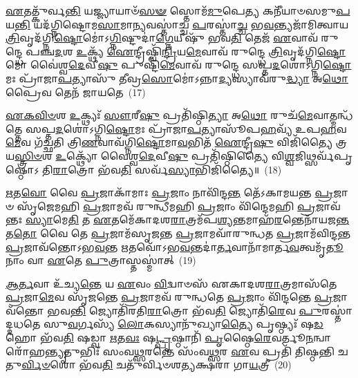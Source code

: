 \-\ul{𑌏}\-𑌤𑌤𑍍𑌕𑍁᳴𑌰𑍍𑌵\-\ul{𑌨𑍍𑌤𑌿} 𑌯𑌜𑍍𑌜𑍍𑌯𑌾𑌯𑌾𑍞᳴\-\ul{𑌸}\-\-\ul{𑍟} 𑌸𑍍𑌤𑍋𑌮᳴\-\ul{𑌮𑍁}\-𑌪𑍇\-\ul{𑌤𑍍𑌯} 𑌕𑌨𑍀᳴𑌯𑌾𑍞𑌸𑌮𑍁\-\ul{𑌪}\-𑌯\-\ul{𑌨𑍍𑌤𑌿} 𑌯𑌦᳴𑌗𑍍𑌨𑌿𑌷𑍍𑌟𑍋𑌮\-\ul{𑌸𑌾}\-𑌮𑌾\-\ul{𑌨𑍍𑌯}\-𑌵𑌸𑍍𑌤𑌾॑𑌚𑍍𑌚 \ul{𑌪}\-𑌰𑌸𑍍𑌤𑌾॑\-\ul{𑌚𑍍𑌚} 𑌭\-\ul{𑌵}\-𑌨𑍍𑌤𑍍𑌯𑌜𑌾᳴𑌮𑌿𑌤𑍍𑌵𑌾𑌯 \ul{𑌤𑍍𑌰𑌿}\-𑌵𑍃𑌦᳴𑌗𑍍𑌨𑌿\-\ul{𑌷𑍍𑌟𑍋}\-𑌮𑍋॑\-𑌽\-\ul{𑌗𑍍𑌨𑌿}\-𑌷𑍍𑌟𑍁𑌦𑌾॑\-\ul{𑌗𑍍𑌨𑍇}\-𑌯𑍀𑌷𑍁᳴ 𑌭𑌵\-\ul{𑌤𑌿} 𑌤𑍇𑌜᳴ \ul{𑌏}\-𑌵𑌾𑌵᳴ 𑌰𑍁𑌨𑍍𑌦𑍍𑌧𑍇 𑌪𑌞𑍍𑌚\-\ul{𑌦}\-𑌶 \ul{𑌉}\-𑌕𑍍𑌥𑍍𑌯᳴ \ul{𑌐}\-𑌨𑍍𑌦𑍍𑌰𑍀𑌷𑍍𑌵𑌿᳴\-\ul{𑌨𑍍𑌦𑍍𑌰𑌿}\-𑌯\-\ul{𑌮𑍇}\-𑌵𑌾𑌵᳴ 𑌰𑍁𑌨𑍍𑌦𑍍𑌧𑍇 \ul{𑌤𑍍𑌰𑌿}\-𑌵𑍃𑌦᳴𑌗𑍍𑌨𑌿\-\ul{𑌷𑍍𑌟𑍋}\-𑌮𑍋 𑌵𑍈॑𑌶𑍍𑌵\-\ul{𑌦𑍇}\-𑌵𑍀\-\ul{𑌷𑍁} 𑌪𑍁𑌷𑍍𑌟𑌿᳴\-\ul{𑌮𑍇}\-𑌵𑌾𑌵᳴ 𑌰𑍁𑌨𑍍𑌦𑍍𑌧𑍇 𑌸𑌪𑍍𑌤\-\ul{𑌦}\-𑌶𑍋॑\-𑌽𑌗𑍍𑌨𑌿\-\ul{𑌷𑍍𑌟𑍋}\-𑌮𑌃 𑌪𑍍𑌰𑌾᳴𑌜𑌾\-\ul{𑌪}\-𑌤𑍍𑌯𑌾𑌸𑍁᳴ 𑌤𑍀𑌵𑍍𑌰\-\ul{𑌸𑍋}\-𑌮𑍋॑\-𑌽𑌨𑍍𑌨𑌾\-\ul{𑌦𑍍𑌯}\-𑌸𑍍𑌯𑌾𑌵᳴𑌰𑍁\-\ul{𑌦𑍍𑌧𑍍𑌯𑌾} 𑌅\-\ul{𑌥𑍋} 𑌪𑍍𑌰𑍈𑌵 𑌤𑍇𑌨᳴ 𑌜𑌾𑌯𑌤𑍇~(17)

\-\ul{𑌏}\-\-\ul{𑌕}\-\-\ul{𑌵𑌿}\-\-\ul{𑍞}\-𑌶 \ul{𑌉}\-𑌕𑍍𑌥𑍍𑌯𑌃᳴ \ul{𑌸𑍗}\-𑌰𑍀\-\ul{𑌷𑍁} 𑌪𑍍𑌰𑌤𑌿᳴𑌷𑍍𑌠𑌿\-\ul{𑌤𑍍𑌯𑌾} 𑌅\-\ul{𑌥𑍋} 𑌰𑍁𑌚᳴\-\ul{𑌮𑍇}\-𑌵𑌾𑌤𑍍𑌮𑌨𑍍𑌧᳴𑌤𑍍𑌤𑍇 𑌸𑌪𑍍𑌤\-\ul{𑌦}\-𑌶𑍋॑\-𑌽𑌗𑍍𑌨𑌿\-\ul{𑌷𑍍𑌟𑍋}\-𑌮𑌃 𑌪𑍍𑌰𑌾᳴𑌜𑌾\-\ul{𑌪}\-𑌤𑍍𑌯𑌾𑌸𑍂᳴𑌪\-\ul{𑌹}\-𑌵𑍍𑌯᳴ 𑌉𑌪\-\ul{𑌹}\-𑌵\-\ul{𑌮𑍇}\-𑌵 𑌗᳴𑌚𑍍𑌛𑌤𑌿 𑌤𑍍𑌰𑌿\-\ul{𑌣}\-𑌵𑌾𑌵᳴𑌗𑍍𑌨𑌿\-\ul{𑌷𑍍𑌟𑍋}\-𑌮𑌾\-\ul{𑌵}\-𑌭𑌿𑌤᳴ \ul{𑌐}\-𑌨𑍍𑌦𑍍𑌰𑍀\-\ul{𑌷𑍁} 𑌵𑌿𑌜𑌿᳴𑌤𑍍𑌯𑍈 𑌤𑍍𑌰𑌯\-\ul{𑌸𑍍𑌤𑍍𑌰𑌿}\-\-\ul{𑍞}\-𑌶 \ul{𑌉}\-𑌕𑍍𑌥𑍍𑌯𑍋᳴ 𑌵𑍈𑌶𑍍𑌵\-\ul{𑌦𑍇}\-𑌵𑍀\-\ul{𑌷𑍁} 𑌪𑍍𑌰𑌤𑌿᳴𑌷𑍍𑌠𑌿𑌤𑍍𑌯𑍈 𑌵𑌿\-\ul{𑌶𑍍𑌵}\-𑌜𑌿𑌥𑍍𑌸𑌰𑍍𑌵᳴𑌪𑍃𑌷𑍍𑌠𑍋\-𑌽 𑌤𑌿\-\ul{𑌰𑌾}\-𑌤𑍍𑌰𑍋 𑌭᳴𑌵\-\ul{𑌤𑌿} 𑌸𑌰𑍍𑌵᳴\-\ul{𑌸𑍍𑌯𑌾}\-𑌭𑌿𑌜𑌿᳴𑌤𑍍𑌯𑍈॥~(18)

{\anuvakamend[{\-\ul{𑌪𑍍𑌰𑌾}\-\-\ul{𑌜𑌾}\-\-\ul{𑌪}\-𑌤𑍍𑌯𑍋 𑌵𑌾 \ul{𑌏}\-𑌷 \ul{𑌯}\-𑌜𑍍𑌞𑍋 𑌯𑌦𑍍𑌦᳴𑌶\-\ul{𑌰𑌾}\-𑌤𑍍𑌰𑌸𑍍𑌤𑍍𑌰𑌿᳴\-\ul{𑌕}\-𑌕𑍁𑌦𑍍𑌵𑌾 \ul{𑌏}\-𑌤𑌾 𑌵𑍈 𑌜𑌾᳴𑌯\-\ul{𑌤} 𑌏𑌕᳴𑌤𑍍𑌰𑌿𑍞𑌶𑌚𑍍𑌚}]}%

\-\ul{𑌋}\-𑌤\-\ul{𑌵𑍋} 𑌵𑍈 \ul{𑌪𑍍𑌰}\-𑌜𑌾𑌕𑌾᳴𑌮𑌾𑌃 \ul{𑌪𑍍𑌰}\-𑌜𑌾𑌂 𑌨𑌾𑌵𑌿᳴𑌨𑍍𑌦\-\ul{𑌨𑍍𑌤} 𑌤𑍇᳴\-𑌽𑌕𑌾𑌮𑌯𑌨𑍍𑌤 \ul{𑌪𑍍𑌰}\-𑌜𑌾𑍞 𑌸𑍃᳴𑌜𑍇𑌮𑌹𑌿 \ul{𑌪𑍍𑌰}\-𑌜𑌾𑌮𑌵᳴ 𑌰𑍁𑌨𑍍𑌧𑍀𑌮𑌹𑌿 \ul{𑌪𑍍𑌰}\-𑌜𑌾𑌂 𑌵𑌿᳴𑌨𑍍𑌦𑍇𑌮𑌹𑌿 \ul{𑌪𑍍𑌰}\-𑌜𑌾𑌵᳴𑌨𑍍𑌤𑌃 \ul{𑌸𑍍𑌯𑌾}\-𑌮𑍇\-\ul{𑌤𑌿} 𑌤 \ul{𑌏}\-𑌤𑌮𑍇᳴𑌕𑌾𑌦𑌶\-\ul{𑌰𑌾}\-𑌤𑍍𑌰𑌮᳴𑌪\-\ul{𑌶𑍍𑌯}\-𑌨𑍍𑌤𑌮𑌾𑌹᳴\-\ul{𑌰}\-𑌨𑍍𑌤𑍇𑌨𑌾᳴𑌯𑌜\-\ul{𑌨𑍍𑌤} 𑌤\-\ul{𑌤𑍋} 𑌵𑍈 𑌤𑍇 \ul{𑌪𑍍𑌰}\-𑌜𑌾𑌮᳴𑌸𑍃𑌜𑌨𑍍𑌤 \ul{𑌪𑍍𑌰}\-𑌜𑌾𑌮𑌵𑌾᳴𑌰𑍁𑌨𑍍𑌧𑌤 \ul{𑌪𑍍𑌰}\-𑌜𑌾𑌮᳴𑌵𑌿𑌨𑍍𑌦𑌨𑍍𑌤 \ul{𑌪𑍍𑌰}\-𑌜𑌾𑌵᳴𑌨𑍍𑌤𑍋\-𑌽𑌭\-\ul{𑌵}\-𑌨𑍍𑌤 \ul{𑌋}\-𑌤𑌵𑍋᳴\-𑌽𑌭\-\ul{𑌵}\-𑌨𑍍𑌤𑌦𑌾॑\-\ul{𑌰𑍍𑌤}\-𑌵𑌾𑌨𑌾᳴𑌮𑌾𑌰𑍍𑌤\-\ul{𑌵}\-𑌤𑍍𑌵𑌮𑍃᳴\-\ul{𑌤𑍂}\-𑌨𑌾𑌂 𑌵𑌾 \ul{𑌏}\-𑌤𑍇 \ul{𑌪𑍁}\-𑌤𑍍𑌰𑌾𑌸𑍍𑌤𑌸𑍍𑌮𑌾॑𑌤𑍍~(19)

\-\ul{𑌆}\-\-\ul{𑌰𑍍𑌤}\-𑌵𑌾 𑌉᳴𑌚𑍍𑌯\-\ul{𑌨𑍍𑌤𑍇} 𑌯 \ul{𑌏}\-𑌵𑌂 \ul{𑌵𑌿}\-𑌦𑍍𑌵𑌾𑍞𑌸᳴ 𑌏𑌕𑌾𑌦𑌶\-\ul{𑌰𑌾}\-𑌤𑍍𑌰𑌮𑌾𑌸᳴𑌤𑍇 \ul{𑌪𑍍𑌰}\-𑌜𑌾\-\ul{𑌮𑍇}\-𑌵 𑌸𑍃᳴𑌜𑌨𑍍𑌤𑍇 \ul{𑌪𑍍𑌰}\-𑌜𑌾𑌮𑌵᳴ 𑌰𑍁𑌨𑍍𑌧𑌤𑍇 \ul{𑌪𑍍𑌰}\-𑌜𑌾𑌂 𑌵𑌿᳴𑌨𑍍𑌦𑌨𑍍𑌤𑍇 \ul{𑌪𑍍𑌰}\-𑌜𑌾𑌵᳴𑌨𑍍𑌤𑍋 𑌭𑌵\-\ul{𑌨𑍍𑌤𑌿} 𑌜𑍍𑌯𑍋𑌤𑌿᳴𑌰𑌤𑌿\-\ul{𑌰𑌾}\-𑌤𑍍𑌰𑍋 𑌭᳴𑌵\-\ul{𑌤𑌿} 𑌜𑍍𑌯𑍋𑌤𑌿᳴\-\ul{𑌰𑍇}\-𑌵 \ul{𑌪𑍁}\-𑌰𑌸𑍍𑌤𑌾॑𑌦𑍍𑌦𑌧𑌤𑍇 𑌸𑍁\-\ul{𑌵}\-𑌰𑍍𑌗𑌸𑍍𑌯᳴ \ul{𑌲𑍋}\-𑌕𑌸𑍍𑌯𑌾𑌨𑍁᳴𑌖𑍍𑌯𑌾\-\ul{𑌤𑍍𑌯𑍈} 𑌪𑍃𑌷𑍍𑌠𑍍𑌯𑌃᳴ 𑌷\-\ul{𑌡}\-𑌹𑍋 𑌭᳴𑌵\-\ul{𑌤𑌿} 𑌷𑌡𑍍𑌵𑌾 \ul{𑌋}\-𑌤\-\ul{𑌵𑌃} 𑌷\-\ul{𑌟𑍍𑌪𑍃}\-𑌷𑍍𑌠𑌾𑌨𑌿᳴ \ul{𑌪𑍃}\-𑌷𑍍𑌠𑍈\-\ul{𑌰𑍇}\-𑌵𑌰𑍍𑌤𑍂\-\ul{𑌨}\-𑌨𑍍𑌵𑌾𑌰𑍋᳴𑌹\-\ul{𑌨𑍍𑌤𑍍𑌯𑍃}\-𑌤𑍁𑌭𑌿𑌃᳴ 𑌸𑌂𑌵\-\ul{𑌥𑍍𑌸}\-𑌰𑌨𑍍𑌤𑍇 𑌸𑌂᳴𑌵\-\ul{𑌥𑍍𑌸}\-𑌰 \ul{𑌏}\-𑌵 𑌪𑍍𑌰𑌤𑌿᳴ 𑌤𑌿𑌷𑍍𑌠𑌨𑍍𑌤𑌿 𑌚𑌤𑍁\-\ul{𑌰𑍍𑌵𑌿}\-\-\ul{𑍞}\-𑌶𑍋 𑌭᳴𑌵\-\ul{𑌤𑌿} 𑌚𑌤𑍁᳴𑌰𑍍𑌵𑌿𑍞𑌶𑌤𑍍𑌯𑌕𑍍𑌷𑌰𑌾 𑌗𑌾\-\ul{𑌯}\-𑌤𑍍𑌰𑍀~(20)

